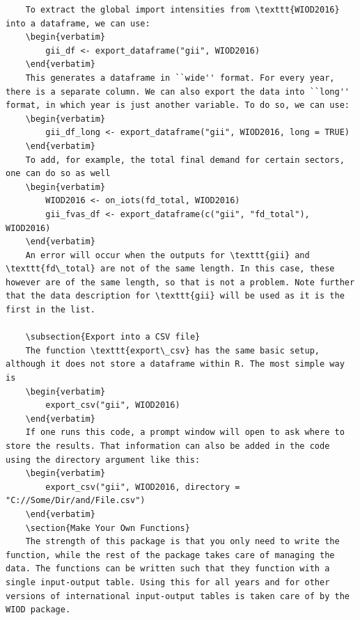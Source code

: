 \documentclass[10pt,a4paper]{paper}
\begin{document}
\begin{itemize}
\begin{Verbatim}
	To extract the global import intensities from \texttt{WIOD2016} into a dataframe, we can use:
	\begin{verbatim}
		gii_df <- export_dataframe("gii", WIOD2016)
	\end{verbatim}
	This generates a dataframe in ``wide'' format. For every year, there is a separate column. We can also export the data into ``long'' format, in which year is just another variable. To do so, we can use:
	\begin{verbatim}
		gii_df_long <- export_dataframe("gii", WIOD2016, long = TRUE)
	\end{verbatim}
	To add, for example, the total final demand for certain sectors, one can do so as well
	\begin{verbatim}
		WIOD2016 <- on_iots(fd_total, WIOD2016)
		gii_fvas_df <- export_dataframe(c("gii", "fd_total"), WIOD2016)
	\end{verbatim}	
	An error will occur when the outputs for \texttt{gii} and \texttt{fd\_total} are not of the same length. In this case, these however are of the same length, so that is not a problem. Note further that the data description for \texttt{gii} will be used as it is the first in the list.
	
	\subsection{Export into a CSV file}
	The function \texttt{export\_csv} has the same basic setup, although it does not store a dataframe within R. The most simple way is
	\begin{verbatim}
		export_csv("gii", WIOD2016)
	\end{verbatim}
	If one runs this code, a prompt window will open to ask where to store the results. That information can also be added in the code using the directory argument like this:
	\begin{verbatim}
		export_csv("gii", WIOD2016, directory = "C://Some/Dir/and/File.csv")
	\end{verbatim}
	\section{Make Your Own Functions}
	The strength of this package is that you only need to write the function, while the rest of the package takes care of managing the data. The functions can be written such that they function with a single input-output table. Using this for all years and for other versions of international input-output tables is taken care of by the WIOD package.
	

\end{Verbatim}
\end{itemize}
\end{document}
